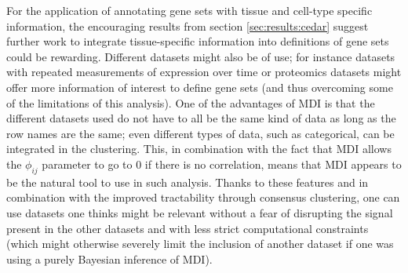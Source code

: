 \documentclass[12pt]{article} %
\begin{document}
	For the application of annotating gene sets with tissue and cell-type specific information, the encouraging results from section \ref{sec:results:cedar} suggest further work to integrate tissue-specific information into definitions of gene sets could be rewarding. Different datasets might also be of use; for instance datasets with repeated measurements of expression over time or proteomics datasets might offer more information of interest to define gene sets (and thus overcoming some of the limitations of this analysis). One of the advantages of MDI is that the different datasets used do not have to all be the same kind of data as long as the row names are the same; even different types of data, such as categorical, can be integrated in the clustering. This, in combination with the fact that MDI allows the $\phi_{ij}$ parameter to go to 0 if there is no correlation, means that MDI appears to be the natural tool to use in such analysis. Thanks to these features and in combination with the improved tractability through consensus clustering, one can use datasets one thinks might be relevant without a fear of disrupting the signal present in the other datasets and with less strict computational constraints (which might otherwise severely limit the inclusion of another dataset if one was using a purely Bayesian inference of MDI).
	
	
	
\end{document}

